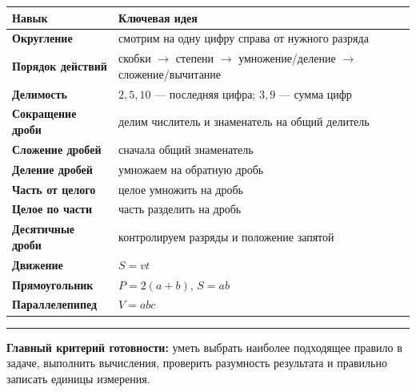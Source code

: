 \documentclass[12pt,a4paper]{article}
\begin{document}
\begin{center}
\begin{tabularx}{\textwidth}{@{}>{\bfseries}l X@{}}
\toprule
Навык & Ключевая идея \\
\midrule
Округление & смотрим на одну цифру справа от нужного разряда \\
Порядок действий & скобки $\to$ степени $\to$ умножение/деление $\to$ сложение/вычитание \\
Делимость & $2,5,10$ --- последняя цифра; $3,9$ --- сумма цифр \\
Сокращение дроби & делим числитель и знаменатель на общий делитель \\
Сложение дробей & сначала общий знаменатель \\
Деление дробей & умножаем на обратную дробь \\
Часть от целого & целое умножить на дробь \\
Целое по части & часть разделить на дробь \\
Десятичные дроби & контролируем разряды и положение запятой \\
Движение & $S=vt$ \\
Прямоугольник & $P=2(a+b)$, $S=ab$ \\
Параллелепипед & $V=abc$ \\
\bottomrule
\end{tabularx}
\end{center}

\vspace{1em}
\textcolor{accent}{\rule{\textwidth}{0.5pt}}

\textbf{Главный критерий готовности:} уметь выбрать наиболее подходящее правило в задаче, выполнить вычисления, проверить разумность результата и правильно записать единицы измерения.
\end{document}
